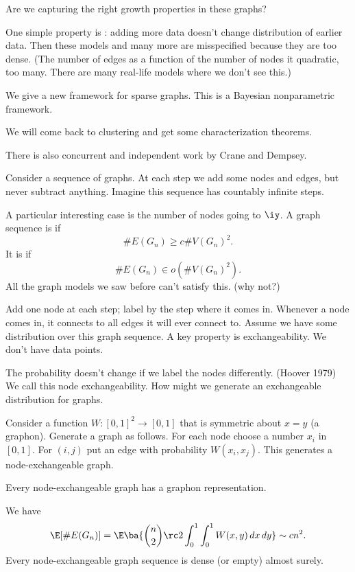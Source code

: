 Are we capturing the right growth properties in these graphs?

One simple property is : adding more data doesn't change distribution of earlier data.  Then these models and many more are misspecified because they are too dense. (The number of edges as a function of the number of nodes it quadratic, too many. There are many real-life models where we don't see this.)

We give a new framework for sparse graphs. This is a Bayesian nonparametric framework.

We will come back to clustering and get some characterization theorems.

There is also concurrent and independent work by Crane and Dempsey.

Consider a sequence of graphs. At each step we add some nodes and edges, but never subtract anything.
Imagine this sequence has countably infinite steps.

A particular interesting case is the number of nodes going to $\iy$. A graph sequence is  if 
$$\# E(G_n) \ge c\# V(G_n)^2.$$
It is  if 
$$\# E(G_n) \in o(\# V(G_n)^2).$$
All the graph models we saw before can't satisfy this. (why not?) 

Add one node at each step; label by the step where it comes in. Whenever a node comes in, it connects to all edges it will ever connect to.
Assume we have some distribution over this graph sequence. 
A key property is exchangeability. We don't have data points. 

The probability doesn't change if we label the nodes differently. (Hoover 1979) We call this node exchangeability. How might we generate an exchangeable distribution for graphs.

Consider a function  $W:[0,1]^2 \to [0,1]$ that is symmetric about $x=y$ (a graphon). %
Generate a graph as follows. For each node choose a number $x_i$ in $[0,1]$. %
For $(i,j)$ put an edge with probability $W(x_i,x_j)$. This generates a node-exchangeable graph.

\begin{thm}
Every node-exchangeable graph has a graphon representation.
\end{thm}
We have
$$
\E[\# E(G_n)] = \E \ba{\binom n2 \rc 2\int_0^1\int_0^1 W(x,y)\,dx\,dy} \sim cn^2.
$$
Every node-exchangeable graph sequence is dense (or empty) almost surely.

